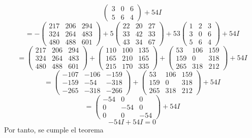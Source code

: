 \begin{itemize}
$$\begin{pmatrix}
    3&0&6\\ 5&6&4\end{pmatrix}+54I$$
    $$=-\begin{pmatrix}217&206&294\\ 324&264&483\\ 480&488&601\end{pmatrix}+5\begin{pmatrix}22&20&27\\ 33&42&33\\ 43&34&67\end{pmatrix}+53\begin{pmatrix}1&2&3\\ 3&0&6\\ 5&6&4\end{pmatrix}+54I$$
    $$=\begin{pmatrix}217&206&294\\ 324&264&483\\ 480&488&601\end{pmatrix}+\begin{pmatrix}110&100&135\\ 165&210&165\\ 215&170&335\end{pmatrix}+\begin{pmatrix}53&106&159\\ 159&0&318\\ 265&318&212\end{pmatrix}+54I$$
    $$=\begin{pmatrix}-107&-106&-159\\ -159&-54&-318\\ -265&-318&-266\end{pmatrix}+\begin{pmatrix}53&106&159\\ 159&0&318\\ 265&318&212\end{pmatrix}+54I$$
    $$=\begin{pmatrix}-54&0&0\\ 0&-54&0\\ 0&0&-54\end{pmatrix}+54I$$
    $$-54I+54I=0$$
    Por tanto, se cumple el teorema
    

\end{itemize}
